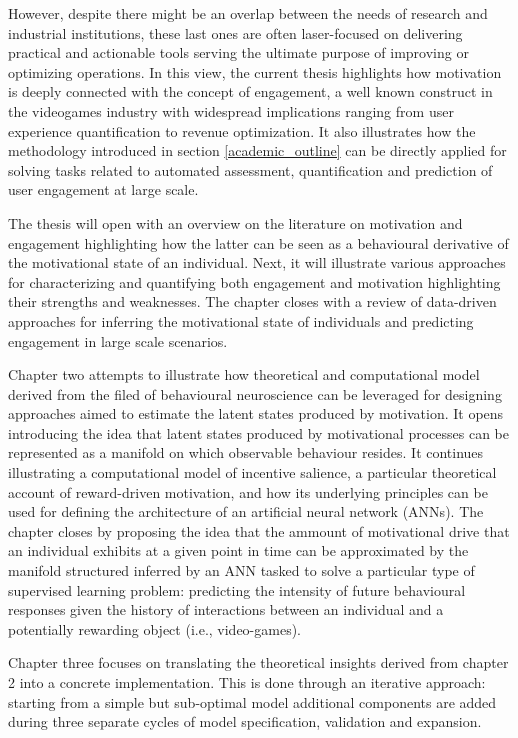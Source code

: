 However, despite there might be an overlap between the needs of research and industrial institutions, these last ones are often laser-focused on delivering practical and actionable tools serving the ultimate purpose of improving or optimizing operations. In this view, the current thesis highlights how motivation is deeply connected with the concept of engagement, a well known construct in the videogames industry with widespread implications ranging from user experience quantification to revenue optimization. It also illustrates how the methodology introduced in section \ref{academic_outline} can be directly applied for solving tasks related to automated assessment, quantification and prediction of user engagement at large scale.

The thesis will open with an overview on the literature on motivation and engagement highlighting how the latter can be seen as a behavioural derivative of the motivational state of an individual. Next, it will illustrate various approaches for characterizing and quantifying both engagement and motivation highlighting their strengths and weaknesses. The chapter closes with a review of data-driven approaches for inferring the motivational state of individuals and predicting engagement in large scale scenarios. 

Chapter two attempts to illustrate how theoretical and computational model derived from the filed of behavioural neuroscience can be leveraged for designing approaches aimed to estimate the latent states produced by motivation. It opens introducing the idea that latent states produced by motivational processes can be represented as a manifold on which observable behaviour resides. It continues illustrating a computational model of incentive salience, a particular theoretical account of reward-driven motivation, and how its underlying principles can be used for defining the architecture of an artificial neural network (ANNs). The chapter closes by proposing the idea that the ammount of motivational drive that an individual exhibits at a given point in time can be approximated by the manifold structured inferred by an ANN tasked to solve a particular type of supervised learning problem: predicting the intensity of future behavioural responses given the history of interactions between an individual and a potentially rewarding object (i.e., video-games). 

Chapter three focuses on translating the theoretical insights derived from chapter 2 into a concrete implementation. This is done through an iterative approach: starting from a simple but sub-optimal model additional components are added during three separate cycles of model specification, validation and expansion. 

